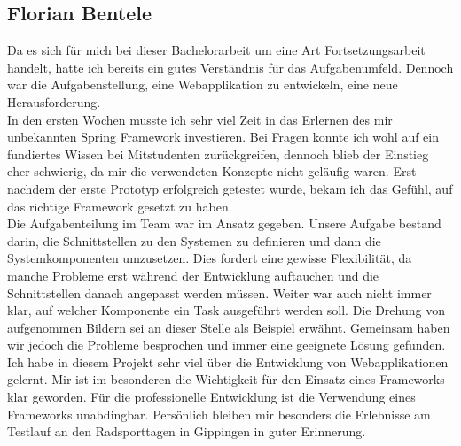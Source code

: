 \subsection{Florian Bentele}
Da es sich für mich bei dieser Bachelorarbeit um eine Art Fortsetzungsarbeit handelt, hatte ich bereits ein gutes Verständnis für das Aufgabenumfeld. Dennoch war die Aufgabenstellung, eine Webapplikation zu entwickeln, eine neue Herausforderung.
\\

In den ersten Wochen musste ich sehr viel Zeit in das Erlernen des mir unbekannten Spring Framework investieren. Bei Fragen konnte ich wohl auf ein fundiertes Wissen bei Mitstudenten zurückgreifen, dennoch blieb der Einstieg eher schwierig, da mir die verwendeten Konzepte nicht geläufig waren. Erst nachdem der erste Prototyp erfolgreich getestet wurde, bekam ich das Gefühl, auf das richtige Framework gesetzt zu haben.
\\

Die Aufgabenteilung im Team war im Ansatz gegeben. Unsere Aufgabe bestand darin, die Schnittstellen zu den Systemen zu definieren und dann die Systemkomponenten umzusetzen. Dies fordert eine gewisse Flexibilität, da manche Probleme erst während der Entwicklung auftauchen und die Schnittstellen danach angepasst werden müssen. Weiter war auch nicht immer klar, auf welcher Komponente ein Task ausgeführt werden soll. Die Drehung von aufgenommen Bildern sei an dieser Stelle als Beispiel erwähnt. Gemeinsam haben wir jedoch die Probleme besprochen und immer eine geeignete Lösung gefunden.
\\

Ich habe in diesem Projekt sehr viel über die Entwicklung von Webapplikationen gelernt. Mir ist im besonderen die Wichtigkeit für den Einsatz eines Frameworks klar geworden. Für die professionelle Entwicklung ist die Verwendung eines Frameworks unabdingbar. Persönlich bleiben mir besonders die Erlebnisse am Testlauf an den Radsporttagen in Gippingen in guter Erinnerung.
